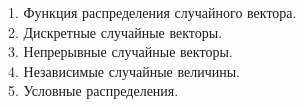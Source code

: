 
1. Функция распределения случайного вектора. \\


2. Дискретные случайные векторы. \\


3. Непрерывные случайные векторы. \\


4. Независимые случайные величины. \\


5. Условные распределения. \\
